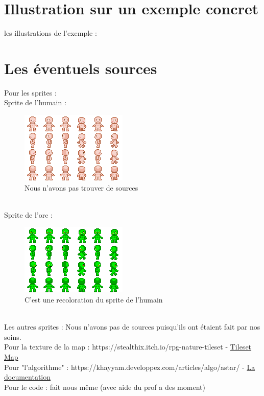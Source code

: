 \documentclass[a4paper, 11pt]{article}
\begin{document}
\section{Illustration sur un exemple concret}
les illustrations de l'exemple :\\
\newpage

\section{Les éventuels sources}

Pour les sprites : \\
		 Sprite de l'humain :
\begin{figure}[ht!]
 \centering
 \includegraphics[width=0.5\linewidth]{images/human.png}
 \caption{Nous n'avons pas trouver de sources}
 \label{fig::example::one}
\end{figure}
\\
		 Sprite de l'orc :
\begin{figure}[ht!]
 \centering
 \includegraphics[width=0.5\linewidth]{images/orc.png}
 \caption{C'est une recoloration du sprite de l'humain}
 \label{fig::example::one}
\end{figure}
\\
		 Les autres sprites : Nous n'avons pas de sources puisqu'ils ont étaient fait par nos soins.\\
Pour la texture de la map : https://stealthix.itch.io/rpg-nature-tileset  - \href{https://stealthix.itch.io/rpg-nature-tileset}{Tileset Map}\\
Pour "l'algorithme" : https://khayyam.developpez.com/articles/algo/astar/ - \href{https://khayyam.developpez.com/articles/algo/astar/}{La documentation}\\
Pour le code : fait nous même (avec aide du prof a des moment)\\
\end{document}
